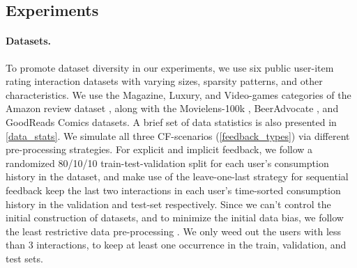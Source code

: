 \subsection{Experiments} \label{main_exp}

\paragraph{Datasets.} To promote dataset diversity in our experiments, we use six public user-item rating interaction datasets with varying sizes, sparsity patterns, and other characteristics. We use the Magazine, Luxury, and Video-games categories of the Amazon review dataset \cite{amz_data}, along with the Movielens-100k \cite{movielens}, BeerAdvocate \cite{beer_dataset}, and GoodReads Comics \cite{mengting_goodreads} datasets. A brief set of data statistics is also presented in \cref{data_stats}. We simulate all three CF-scenarios (\cref{feedback_types}) 
via different pre-processing strategies. For explicit and implicit feedback, we follow a randomized 80/10/10 train-test-validation split for each user's consumption history in the dataset, and make use of the leave-one-last \cite{train_test_splitting} strategy for sequential feedback \ie
keep the last two interactions in each user's time-sorted consumption history in the validation and test-set respectively.
Since we can't control the initial construction of datasets, and to minimize the initial data bias, we follow the least restrictive data pre-processing \cite{making_progress, sigir20}. We only weed out the users 
with less
than 3 interactions,
to keep at least one occurrence 
in the train, validation, and test sets.



